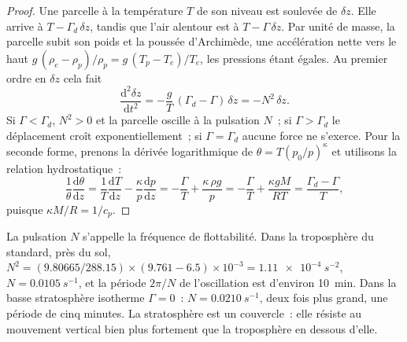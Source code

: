 \begin{proof}
Une parcelle à la température $T$ de son niveau est soulevée de $\delta z$. Elle arrive
à $T - \Gamma_d\,\delta z$, tandis que l'air alentour est à $T - \Gamma\,\delta z$.
Par unité de masse, la parcelle subit son poids et la poussée d'Archimède, une
accélération nette vers le haut $g\,(\rho_e - \rho_p)/\rho_p = g\,(T_p - T_e)/T_e$, les
pressions étant égales. Au premier ordre en $\delta z$ cela fait
\[
  \frac{\mathrm d^2 \delta z}{\mathrm dt^2} = -\frac{g}{T}\,(\Gamma_d - \Gamma)\,\delta z = -N^2\,\delta z .
\]
Si $\Gamma < \Gamma_d$, $N^2 > 0$ et la parcelle oscille à la
pulsation $N$~; si $\Gamma > \Gamma_d$ le déplacement croît exponentiellement~; si
$\Gamma = \Gamma_d$ aucune force ne s'exerce. Pour la seconde forme, prenons la
dérivée logarithmique de $\theta = T (p_0/p)^{\kappa}$ et utilisons la relation hydrostatique~:
\[
  \frac{1}{\theta}\frac{\mathrm d\theta}{\mathrm dz} = \frac{1}{T}\frac{\mathrm dT}{\mathrm dz}
  - \frac{\kappa}{p}\frac{\mathrm dp}{\mathrm dz} = -\frac{\Gamma}{T} + \frac{\kappa\,\rho g}{p}
  = -\frac{\Gamma}{T} + \frac{\kappa g M}{RT} = \frac{\Gamma_d - \Gamma}{T},
\]
puisque $\kappa M/R = 1/c_p$.
\end{proof}

La pulsation $N$ s'appelle la fréquence de flottabilité. Dans la troposphère
du standard, près du sol, $N^2 = (9.80665/288.15) \times (9.761 -
6.5)\times10^{-3} = \qty{1.11e-4}{s^{-2}}$, $N = \qty{0.0105}{s^{-1}}$, et la
période $2\pi/N$ de l'oscillation est d'environ \qty{10}{min}. Dans la basse
stratosphère isotherme $\Gamma = 0$~: $N = \qty{0.0210}{s^{-1}}$, deux fois plus grand, une
période de cinq minutes. La stratosphère est un couvercle~: elle résiste au mouvement vertical
bien plus fortement que la troposphère en dessous d'elle.

